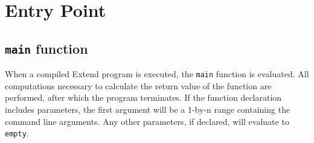 \section{Entry Point}
\subsection{\texttt{main} function}
When a compiled Extend program is executed, the \texttt{main} function is evaluated. All computations necessary to calculate the return value of the function are performed, after which the program terminates. If the function declaration includes parameters, the first argument will be a 1-by-n range containing the command line arguments. Any other parameters, if declared, will evaluate to \texttt{empty}.
